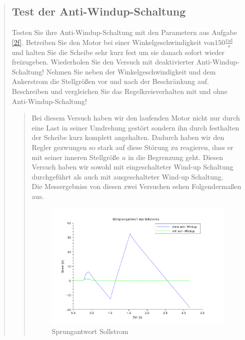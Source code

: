 \begin{quote}
    \subsection{Test der Anti-Windup-Schaltung}
    Testen Sie ihre Anti-Windup-Schaltung mit den Parametern aus Aufgabe \ref{2f}. Betreiben
    Sie den Motor bei einer Winkelgeschwindigkeit von$150 \mathrm{\frac{rad}{s}}$
    und halten Sie die Scheibe
    sehr kurz fest um sie danach sofort wieder freizugeben. Wiederholen Sie den Versuch mit
    deaktivierter Anti-Windup-Schaltung! Nehmen Sie neben der Winkelgeschwindigkeit
    und dem Ankerstrom die Stellgrößen vor und nach der Beschränkung auf. Beschreiben
    und vergleichen Sie das Regelkreisverhalten mit und ohne Anti-Windup-Schaltung!
    
    \begin{quote}
        
        Bei diesem Versuch haben wir den laufenden Motor nicht nur durch eine Last in seiner Umdrehung gestört sondern
        ihn durch festhalten der Scheibe kurz komplett angehalten. Dadurch haben wir den Regler gezwungen so stark auf
        diese Störung zu reagieren, dass er mit seiner inneren Stellgröße $u$ in die Begrenzung geht. Diesen Versuch
        haben wir sowohl mit eingeschalteter Wind-up Schaltung durchgeführt als auch mit ausgeschalteter Wind-up
        Schaltung.\\
        
        Die Messergebniss von diesen zwei Versuchen sehen Folgendermaßen aus.
        
        \begin{figure}[H]
        \centering
            \includegraphics[scale=0.8, trim = 0.5cm 0.5cm 2cm 0.5cm,
            clip]{./Bilder/windup_sprungantwort_sollstrom}    
            \caption{Sprungantwort Sollstrom}
        \end{figure}
        

\end{quote}
\end{quote}
